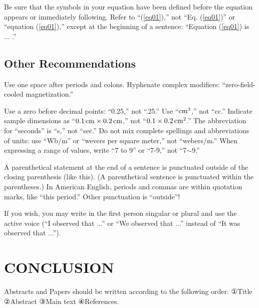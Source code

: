 \documentclass{fullpaper_hutech}
\begin{document}
Be sure that the symbols in your equation have been defined before the equation appears or immediately following. Refer to ``(\ref{eq01}),'' not ``Eq. (\ref{eq01})'' or ``equation (\ref{eq01}),'' except at the beginning of a sentence: ``Equation (\ref{eq01}) is ... .''


\subsection{Other Recommendations}

Use one space after periods and colons. Hyphenate complex modifiers: ``zero-field-cooled magnetization.''

Use a zero before decimal points: ``0.25,'' not ``.25.'' Use ``$\rm cm^3$,'' not ``cc.'' Indicate sample dimensions as ``$0.1\,\rm cm\times 0.2\, cm$,'' not ``$0.1\times 0.2\,\rm cm^2$.'' The abbreviation for ``seconds'' is ``s,'' not ``sec.'' Do not mix complete spellings and abbreviations of units: use ``Wb/m'' or ``wevers per square meter,'' not ``webers/m.'' When expressing a range of values, write ``7 to 9'' or ``7-9,'' not ``7$\sim$9.''

A parenthetical statement at the end of a sentence is punctuated outside of the closing parenthesis (like this). (A parenthetical sentence is punctuated within the parentheses.) In American English, periods and commas are within quotation marks, like ``this period.'' Other punctuation is ``outside''!

If you wish, you may write in the first person singular or plural and use the active voice (``I observed that ...'' or ``We observed that ...'' instead of ``It was observed that ...'').

\section{CONCLUSION}

Abstracts and Papers should be written according to the following order: ①Title ②Abstract ③Main text ④References.

{\small
}
\end{document}
